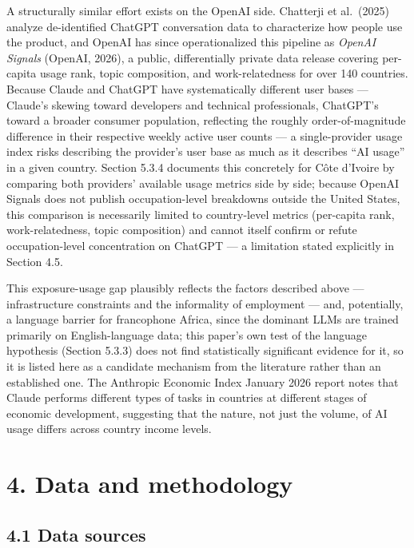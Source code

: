 \documentclass[
  11pt,
]{article}
\begin{document}
A structurally similar effort exists on the OpenAI side. Chatterji et
al.~(2025) analyze de-identified ChatGPT conversation data to
characterize how people use the product, and OpenAI has since
operationalized this pipeline as \emph{OpenAI Signals} (OpenAI, 2026), a
public, differentially private data release covering per-capita usage
rank, topic composition, and work-relatedness for over 140 countries.
Because Claude and ChatGPT have systematically different user bases ---
Claude's skewing toward developers and technical professionals,
ChatGPT's toward a broader consumer population, reflecting the roughly
order-of-magnitude difference in their respective weekly active user
counts --- a single-provider usage index risks describing the provider's
user base as much as it describes ``AI usage'' in a given country.
Section 5.3.4 documents this concretely for Côte d'Ivoire by comparing
both providers' available usage metrics side by side; because OpenAI
Signals does not publish occupation-level breakdowns outside the United
States, this comparison is necessarily limited to country-level metrics
(per-capita rank, work-relatedness, topic composition) and cannot itself
confirm or refute occupation-level concentration on ChatGPT --- a
limitation stated explicitly in Section 4.5.

This exposure-usage gap plausibly reflects the factors described above
--- infrastructure constraints and the informality of employment ---
and, potentially, a language barrier for francophone Africa, since the
dominant LLMs are trained primarily on English-language data; this
paper's own test of the language hypothesis (Section 5.3.3) does not
find statistically significant evidence for it, so it is listed here as
a candidate mechanism from the literature rather than an established
one. The Anthropic Economic Index January 2026 report notes that Claude
performs different types of tasks in countries at different stages of
economic development, suggesting that the nature, not just the volume,
of AI usage differs across country income levels.

\section{4. Data and methodology}\label{data-and-methodology}

\subsection{4.1 Data sources}\label{data-sources}
\end{document}
